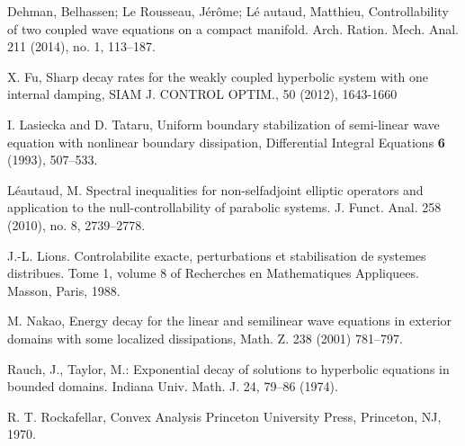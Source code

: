 \documentclass[11pt,reqno]{amsart}
\theoremstyle{plain}
\numberwithin{equation}{section}
\numberwithin{equation}{section}
\begin{document}
\begin{thebibliography}{99}
 Dehman, Belhassen; Le Rousseau, J\'{e}r\^{o}me; L\'{e}%
autaud, Matthieu, Controllability of two coupled wave equations on a compact
manifold. Arch. Ration. Mech. Anal. 211 (2014), no. 1, 113--187.

 X. Fu, Sharp decay rates for the weakly coupled hyperbolic
system with one internal damping, SIAM J. CONTROL OPTIM., 50 (2012),
1643-1660

 I. Lasiecka and D. Tataru, Uniform boundary stabilization
of semi-linear wave equation with nonlinear boundary dissipation,
Differential Integral Equations \textbf{6} (1993), 507--533.

 L\'{e}autaud, M. Spectral inequalities for non-selfadjoint
elliptic operators and application to the null-controllability of parabolic
systems. J. Funct. Anal. 258 (2010), no. 8, 2739--2778.

 J.-L. Lions. Controlabilite exacte, perturbations et
stabilisation de systemes distribues. Tome 1, volume 8 of Recherches en
Mathematiques Appliquees. Masson, Paris, 1988.

 M. Nakao, Energy decay for the linear and semilinear wave
equations in exterior domains with some localized dissipations, Math. Z. 238
(2001) 781--797.

 Rauch, J., Taylor, M.: Exponential decay of solutions to
hyperbolic equations in bounded domains. Indiana Univ. Math. J. 24, 79--86
(1974).

 R. T. Rockafellar, Convex Analysis Princeton University
Press, Princeton, NJ, 1970.
\end{thebibliography}
\end{document}
